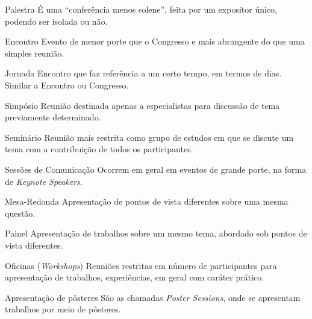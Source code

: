 \begin{frame}
\begin{block}{Palestra}
É uma ``conferência menos solene'', feita por um expositor único, podendo ser isolada ou não.
\end{block}

\begin{block}{Encontro}
Evento de menor porte que o Congresso e mais abrangente do que uma simples reunião. 
\end{block}
\end{frame}

\begin{frame}
\begin{block}{Jornada}
Encontro que faz referência a um certo tempo, em termos de dias. Similar a Encontro ou Congresso.
\end{block}

\begin{block}{Simpósio}
Reunião destinada apenas a especialistas para discussão de tema previamente determinado.
\end{block}
\end{frame}

\begin{frame}
\begin{block}{Seminário}
Reunião mais restrita como grupo de estudos em que se discute um tema com a contribuição de todos os participantes.
\end{block}

\begin{block}{Sessões de Comunicação}
Ocorrem em geral em eventos de grande porte, na forma de \textit{Keynote Speakers}.
\end{block}
\end{frame}

\begin{frame}
\begin{block}{Mesa-Redonda}
Apresentação de pontos de vista diferentes sobre uma mesma questão.
\end{block}

\begin{block}{Painel}
Apresentação de trabalhos sobre um mesmo tema, abordado sob pontos de vista diferentes.
\end{block}
\end{frame}

\begin{frame}
\begin{block}{Oficinas (\textit{Workshops})}
Reuniões restritas em número de participantes para apresentação de trabalhos, experiências, em geral com caráter prático.
\end{block}

\begin{block}{Apresentação de pôsteres}
São as chamadas \textit{Poster Sessions}, onde se apresentam trabalhos por meio de pôsteres.
\end{block}
\end{frame}


